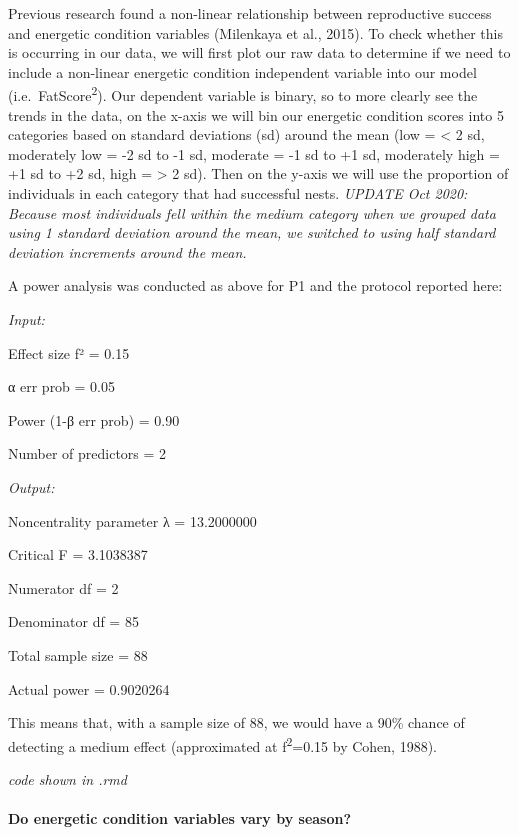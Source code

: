 \documentclass[
]{article}
\begin{document}
Previous research found a non-linear relationship between reproductive
success and energetic condition variables (Milenkaya et al., 2015). To
check whether this is occurring in our data, we will first plot our raw
data to determine if we need to include a non-linear energetic condition
independent variable into our model (i.e.~FatScore\textsuperscript{2}).
Our dependent variable is binary, so to more clearly see the trends in
the data, on the x-axis we will bin our energetic condition scores into
5 categories based on standard deviations (sd) around the mean (low =
\textless{} 2 sd, moderately low = -2 sd to -1 sd, moderate = -1 sd to
+1 sd, moderately high = +1 sd to +2 sd, high = \textgreater{} 2 sd).
Then on the y-axis we will use the proportion of individuals in each
category that had successful nests. \emph{UPDATE Oct 2020: Because most
individuals fell within the medium category when we grouped data using 1
standard deviation around the mean, we switched to using half standard
deviation increments around the mean.}

A power analysis was conducted as above for P1 and the protocol reported
here:

\emph{Input:}

Effect size f² = 0.15

α err prob = 0.05

Power (1-β err prob) = 0.90

Number of predictors = 2

\emph{Output:}

Noncentrality parameter λ = 13.2000000

Critical F = 3.1038387

Numerator df = 2

Denominator df = 85

Total sample size = 88

Actual power = 0.9020264

This means that, with a sample size of 88, we would have a 90\% chance
of detecting a medium effect (approximated at f\textsuperscript{2}=0.15
by Cohen, 1988).

\emph{code shown in .rmd}

\hypertarget{do-energetic-condition-variables-vary-by-season}{%
\paragraph{Do energetic condition variables vary by
season?}\label{do-energetic-condition-variables-vary-by-season}}
\end{document}

